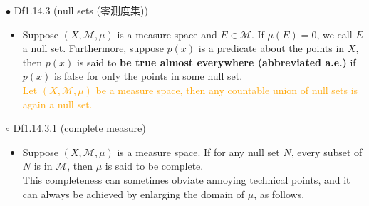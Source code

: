 \documentclass{article}
\begin{document}
{\Large $\bullet$ Df1.14.3 (null sets (零测度集))}\par
\begin{itemize}
    \item[]
    {\large Suppose $(X, \mathcal{M}, \mu)$ is a measure space and $E\in\mathcal{M}$. If $\mu(E)=0$, we call $E$ a null set.
    Furthermore, suppose $p(x)$ is a predicate about the points in $X$, then $p(x)$ is said to 
    \textbf{be true almost everywhere (abbreviated a.e.)} if $p(x)$ is false for only the points in some null set.}\\
    {\textcolor{orange}{Let $(X, \mathcal{M}, \mu)$ be a measure space, then any countable union of null sets is
    again a null set.}}
\end{itemize}\par
\quad

{\Large $\circ $ Df1.14.3.1 (complete measure)}\par
\begin{itemize}
    \item[]
    {\large Suppose $(X, \mathcal{M}, \mu)$ is a measure space. If for any null set $N$, every subset of $N$ is in $\mathcal{M}$,
    then $\mu$ is said to be complete.}\\
    {\textcolor{pf}{This completeness can sometimes obviate annoying technical points, and it can always be achieved by 
    enlarging the domain of $\mu$, as follows.}}
\end{itemize}\par
\quad
\end{document}
